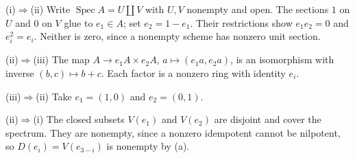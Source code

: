 (i)$\Rightarrow$(ii) Write $\operatorname{Spec}A=U\coprod V$ with $U,V$ nonempty and open. The sections $1$ on $U$ and $0$ on $V$ glue to $e_1\in A$; set $e_2=1-e_1$. Their restrictions show $e_1e_2=0$ and $e_i^2=e_i$. Neither is zero, since a nonempty scheme has nonzero unit section.

(ii)$\Rightarrow$(iii) The map $A\to e_1A\times e_2A$, $a\mapsto(e_1a,e_2a)$, is an isomorphism with inverse $(b,c)\mapsto b+c$. Each factor is a nonzero ring with identity $e_i$.

(iii)$\Rightarrow$(ii) Take $e_1=(1,0)$ and $e_2=(0,1)$.

(ii)$\Rightarrow$(i) The closed subsets $V(e_1)$ and $V(e_2)$ are disjoint and cover the spectrum. They are nonempty, since a nonzero idempotent cannot be nilpotent, so $D(e_i)=V(e_{3-i})$ is nonempty by (a).
